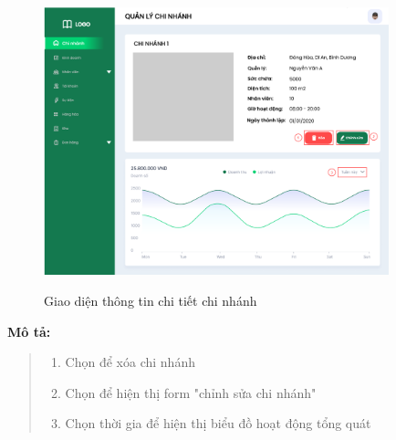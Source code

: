                 \begin{figure}[!htp]
                    \centering
                    \includegraphics[width=10cm]{img/UI/admin/branch_detail.png}
                    \label{21}
                    \newline
                    \caption{Giao diện thông tin chi tiết chi nhánh}
                \end{figure}
                \textbf{Mô tả:}  
                \begin{quote}
                    \begin{enumerate}
                        \item Chọn để xóa chi nhánh
                        \item Chọn để hiện thị form "chỉnh sửa chi nhánh"
                        \item Chọn thời gia để hiện thị biểu đồ hoạt động tổng quát
                    \end{enumerate}
                \end{quote}
    
